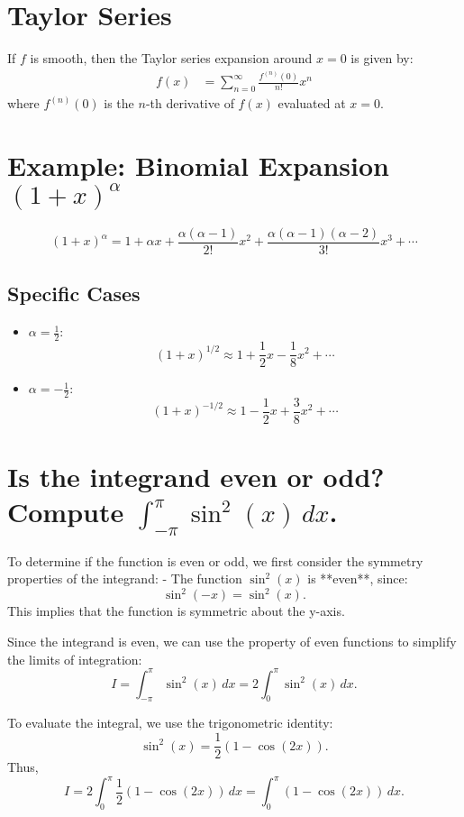 \documentclass[a4paper,12pt]{article}
\begin{document}
\begin{multicols}{2}
\section*{Taylor Series}
If $f$ is smooth, then the Taylor series expansion around $x = 0$ is given by:
\begin{align*}
    f(x) &= \sum_{n=0}^{\infty} \frac{f^{(n)}(0)}{n!} x^n
\end{align*}
where $f^{(n)}(0)$ is the $n$-th derivative of $f(x)$ evaluated at $x = 0$.

\section*{Example: Binomial Expansion $(1+x)^{\alpha}$}
\[
(1 + x)^\alpha = 1 + \alpha x + \frac{\alpha (\alpha - 1)}{2!} x^2 + \frac{\alpha (\alpha - 1) (\alpha - 2)}{3!} x^3 + \cdots
\]

\subsection*{Specific Cases}
\begin{itemize}
    \item $\alpha = \frac{1}{2}$:
    \[
    (1+x)^{1/2} \approx 1 + \frac{1}{2}x - \frac{1}{8}x^2 + \cdots
    \]
    \item $\alpha = -\frac{1}{2}$:
    \[
    (1+x)^{-1/2} \approx 1 - \frac{1}{2}x + \frac{3}{8}x^2 + \cdots
    \]
\end{itemize}

\section*{Is the integrand even or odd? Compute $\int_{-\pi}^{\pi} \sin^2(x) \, dx$.}

To determine if the function is even or odd, we first consider the symmetry properties of the integrand:
- The function \(\sin^2(x)\) is **even**, since:
\[
\sin^2(-x) = \sin^2(x).
\]
This implies that the function is symmetric about the y-axis.

Since the integrand is even, we can use the property of even functions to simplify the limits of integration:
\[
I = \int_{-\pi}^{\pi} \sin^2(x) \, dx = 2 \int_0^{\pi} \sin^2(x) \, dx.
\]

To evaluate the integral, we use the trigonometric identity:
\[
\sin^2(x) = \frac{1}{2}(1 - \cos(2x)).
\]
Thus,
\[
I = 2 \int_0^{\pi} \frac{1}{2} (1 - \cos(2x)) \, dx = \int_0^{\pi} (1 - \cos(2x)) \, dx.
\]


\end{multicols}
\end{document}
